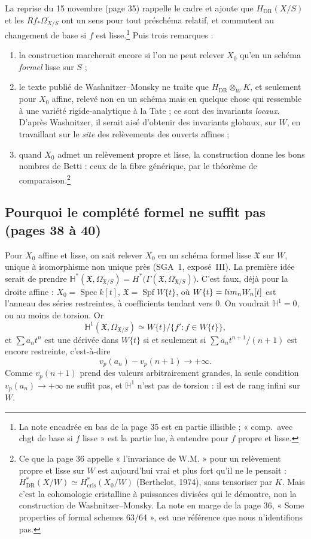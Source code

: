 \documentclass[11pt,a4paper]{article}
\begin{document}
La reprise du 15 novembre (page 35) rappelle le cadre et ajoute que
$H_{\mathrm{DR}}(X/S)$ et les $Rf_{*}\Omega^{\cdot}_{X/S}$ ont un sens pour
tout préschéma relatif, et commutent au changement de base si $f$ est
lisse.\footnote{La note encadrée en bas de la page 35 est en partie
illisible ; « comp.\ avec chgt de base si $f$ lisse » est la partie lue, à
entendre pour $f$ propre et lisse.} Puis trois remarques :
\begin{enumerate}
\item[a)] la construction marcherait encore si l'on ne peut relever $X_0$
  qu'en un schéma \emph{formel} lisse sur $S$ ;
\item[b)] le texte publié de Washnitzer--Monsky ne traite que
  $H_{\mathrm{DR}} \otimes_W K$, et seulement pour $X_0$ affine, relevé non en
  un schéma mais en quelque chose qui ressemble à une variété
  rigide-analytique à la Tate ; ce sont des invariants \emph{locaux}.
  D'après Washnitzer, il serait aisé d'obtenir des invariants globaux, sur
  $W$, en travaillant sur le \emph{site} des relèvements des ouverts
  affines ;
\item[c)] quand $X_0$ admet un relèvement propre et lisse, la construction
  donne les bons nombres de Betti : ceux de la fibre générique, par le
  théorème de comparaison.\footnote{Ce que la page 36 appelle « l'invariance
  de W.M. » pour un relèvement propre et lisse sur $W$ est aujourd'hui vrai
  et plus fort qu'il ne le pensait : $H^{*}_{\mathrm{DR}}(X/W) \simeq
  H^{*}_{\mathrm{cris}}(X_0/W)$ (Berthelot, 1974), sans tensoriser par $K$.
  Mais c'est la cohomologie cristalline à puissances divisées qui le
  démontre, non la construction de Washnitzer--Monsky. La note en marge de la
  page 36, « Some properties of formal schemes 63/64 », est une référence que
  nous n'identifions pas.}
\end{enumerate}

\subsection*{Pourquoi le complété formel ne suffit pas (pages 38 à 40)}

Pour $X_0$ affine et lisse, on sait relever $X_0$ en un schéma formel lisse
$\mathfrak{X}$ sur $W$, unique à isomorphisme non unique près (SGA~1,
exposé~III). La première idée serait de prendre
$\mathbb{H}^{*}(\mathfrak{X}, \Omega^{\cdot}_{\mathfrak{X}/S}) =
H^{*}\bigl(\Gamma(\mathfrak{X}, \Omega^{\cdot}_{\mathfrak{X}/S})\bigr)$. C'est
faux, déjà pour la droite affine : $X_0 = \operatorname{Spec} k[t]$,
$\mathfrak{X} = \operatorname{Spf} W\{t\}$, où $W\{t\} = \varprojlim_n
W_n[t]$ est l'anneau des séries restreintes, à coefficients tendant vers $0$.
On voudrait $\mathbb{H}^{1} = 0$, ou au moins de torsion. Or
\[
  \mathbb{H}^{1}(\mathfrak{X}, \Omega^{\cdot}_{\mathfrak{X}/S})
  \simeq W\{t\} \big/ \{ f' : f \in W\{t\} \} ,
\]
et $\sum a_n t^{n}$ est une dérivée dans $W\{t\}$ si et seulement si $\sum
a_n t^{n+1}/(n+1)$ est encore restreinte, c'est-à-dire
\[
  v_p(a_n) - v_p(n+1) \longrightarrow +\infty .
\]
Comme $v_p(n+1)$ prend des valeurs arbitrairement grandes, la seule condition
$v_p(a_n) \to +\infty$ ne suffit pas, et $\mathbb{H}^{1}$ n'est pas de
torsion : il est de rang infini sur $W$.
\end{document}
